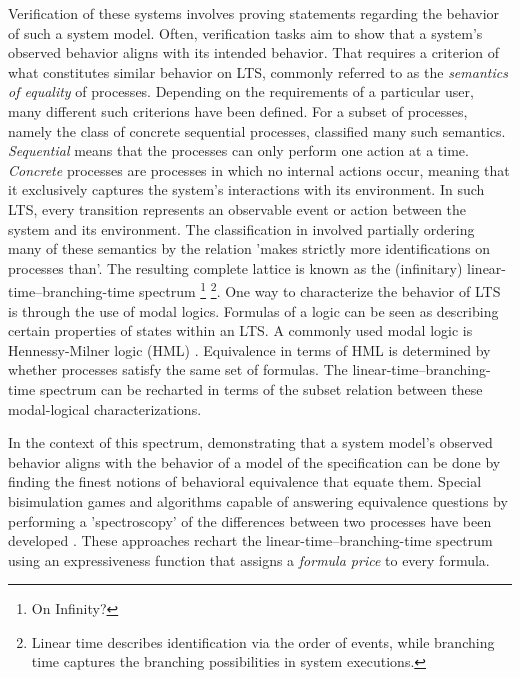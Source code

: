 \begin{isabellebody}
\begin{isamarkuptext}
Verification of these systems involves proving statements regarding the behavior of such a system model. Often, verification tasks aim to show that a system's observed behavior aligns with its intended behavior.
That requires a criterion of what constitutes similar behavior on LTS, commonly referred to as the \textit{semantics of equality} of processes. Depending on the requirements of a particular user, many different such criterions have been defined.
For a subset of processes, namely the class of concrete sequential processes, \cite{GLABBEEK20013} classified many such semantics. 
\textit{Sequential} means that the processes can only perform one action at a time. \textit{Concrete} processes are processes in which no internal actions occur, meaning that it exclusively captures the system's interactions with its environment.
In such LTS, every transition represents an observable event or action between the system and its environment.
The classification in \cite{GLABBEEK20013} involved partially ordering many of these semantics by the relation 'makes strictly more identifications on processes than'. The resulting complete lattice is
known as the (infinitary) linear-time--branching-time spectrum \footnote{On Infinity?} 
\footnote{Linear time describes identification via the order of events, while branching time captures the branching possibilities in system executions.}.
One way to characterize the behavior of LTS is through the use of modal logics. Formulas of a logic can be seen as describing certain properties of states within an LTS. A commonly used modal logic is Hennessy-Milner logic (HML) \cite{hm85}. 
Equivalence in terms of HML is determined by whether processes satisfy the same set of formulas. The linear-time--branching-time spectrum can be recharted in terms of the subset relation between these modal-logical characterizations.%
\end{isamarkuptext}\isamarkuptrue%
%
\begin{isamarkuptext}%
In the context of this spectrum, demonstrating that a system model's observed behavior aligns with the behavior of a model of the specification can be done by 
finding the finest notions of behavioral equivalence that equate them. Special bisimulation games and algorithms capable of answering equivalence questions 
by performing a 'spectroscopy' of the differences between two processes have been developed \cite{bisping2022deciding}\cite{bisping2023process}.
These approaches rechart the linear-time--branching-time spectrum using an expressiveness function that assigns a \textit{formula price} to every formula. 

\end{isamarkuptext}
\end{isabellebody}
